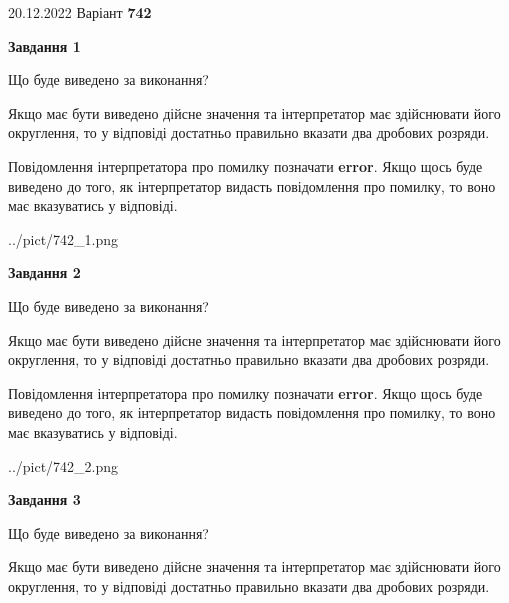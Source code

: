\documentclass[12pt, ukrainian]{article}
\begin{document}
{20.12.2022 Варіант \No \textbf { 742 }\par}
{
\begin {Large}

{\begin {center}\textbf{Завдання 1}\end {center}}\par
Що буде виведено за виконання? \par

Якщо має бути виведено дійсне значення та інтерпретатор має здійснювати його округлення, 
то у відповіді достатньо правильно вказати два дробових розряди.

Повідомлення інтерпретатора про помилку позначати \textbf{error}.
Якщо щось буде виведено до того, як інтерпретатор видасть повідомлення про помилку, 
то воно має вказуватись у відповіді. \par

\begin{center}
	{../pict/742_1.png}
\end{center}
\newpage

{\begin {center}\textbf{Завдання 2}\end {center}}\par
Що буде виведено за виконання? \par

Якщо має бути виведено дійсне значення та інтерпретатор має здійснювати його округлення, 
то у відповіді достатньо правильно вказати два дробових розряди.

Повідомлення інтерпретатора про помилку позначати \textbf{error}.
Якщо щось буде виведено до того, як інтерпретатор видасть повідомлення про помилку, 
то воно має вказуватись у відповіді. \par

\begin{center}
	{../pict/742_2.png}
\end{center}
\newpage

{\begin {center}\textbf{Завдання 3}\end {center}}\par
Що буде виведено за виконання? \par

Якщо має бути виведено дійсне значення та інтерпретатор має здійснювати його округлення, 
то у відповіді достатньо правильно вказати два дробових розряди.


\end{Large}}
\end{document}
